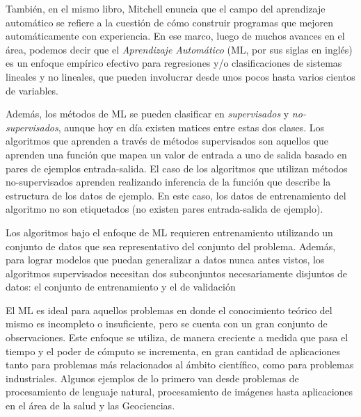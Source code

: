       También, en el mismo libro, Mitchell enuncia que el campo del aprendizaje
      automático se refiere a la cuestión de cómo construir programas
      que mejoren automáticamente con experiencia.
      En ese marco, luego de muchos avances en el área, podemos decir que el
      \textit{Aprendizaje Automático} (ML, por sus siglas en inglés) es un
      enfoque empírico efectivo para regresiones y/o clasificaciones de sistemas
      lineales y no lineales, que pueden involucrar desde unos pocos hasta varios
      cientos de variables.

    \par Además, los métodos de ML se pueden clasificar en
      \textit{supervisados}\cite{supervised_learning} y
      \textit{no-supervisados}\cite{unsupervised_learning}, aunque hoy en día
      existen matices entre estas dos clases\cite{semi_supervised}.
      Los algoritmos que aprenden a través de métodos supervisados son aquellos que
      aprenden una función que mapea un valor de entrada a uno de salida basado
      en pares de ejemplos entrada-salida.
      El caso de los algoritmos que utilizan métodos no-supervisados aprenden
      realizando inferencia de la función que describe la estructura de los datos
      de ejemplo. En este caso, los datos de entrenamiento del algoritmo no son
      etiquetados (no existen pares entrada-salida de ejemplo).

    \par Los algoritmos bajo el enfoque de ML requieren entrenamiento utilizando un
      conjunto de datos que sea representativo del conjunto del problema.
      Además, para lograr modelos que puedan generalizar a datos nunca antes vistos,
      los algoritmos supervisados necesitan dos subconjuntos necesariamente
      disjuntos de datos: el conjunto de entrenamiento y el de validación\cite{test_val}


    \par El ML es ideal para aquellos problemas en donde el conocimiento teórico del mismo
      es incompleto o insuficiente, pero se cuenta con un gran conjunto de observaciones.
      Este enfoque se utiliza, de manera creciente a medida que pasa el tiempo y
      el poder de cómputo se incrementa, en gran cantidad de aplicaciones tanto para
      problemas más relacionados al ámbito científico, como para problemas
      industriales. Algunos ejemplos de lo primero van desde problemas de
      procesamiento de lenguaje
      natural\cite{twitt_nlp, cardellino, svm_semantic}, procesamiento de
      imágenes\cite{face_detection, corner_detection, handwritting} hasta aplicaciones
      en el área de la salud\cite{nutrition_prediction, bigdata_health, age_estimation, children}
      y las Geociencias\cite{solar_irradiation, ml_grs, modeling_mineral}.

